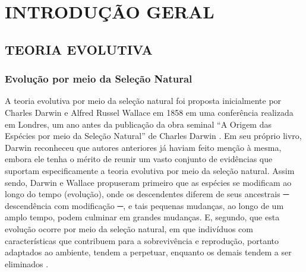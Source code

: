 \chapter{INTRODUÇÃO GERAL}
\label{cap:introducao}

\section{TEORIA EVOLUTIVA}
\label{sec:teoria_evolutiva}

\subsection{Evolução por meio da Seleção Natural}

A teoria evolutiva por meio da seleção natural foi proposta inicialmente por Charles Darwin e Alfred Russel Wallace em 1858 \cite{darwin_tendency_1858} em uma conferência realizada em Londres, um ano antes da publicação da obra seminal “A Origem das Espécies por meio da Seleção Natural” de Charles Darwin \cite{darwin_origin_1859}. Em seu próprio livro, Darwin reconheceu que autores anteriores já haviam feito menção à mesma, embora ele tenha o mérito de reunir um vasto conjunto de evidências que suportam especificamente a teoria evolutiva por meio da seleção natural. Assim sendo, Darwin e Wallace propuseram primeiro que as espécies se modificam ao longo do tempo (evolução), onde os descendentes diferem de seus ancestrais ─ descendência com modificação ─, e tais pequenas mudanças, ao longo de um amplo tempo, podem culminar em grandes mudanças. E, segundo, que esta evolução ocorre por meio da seleção natural, em que indivíduos com características que contribuem para a sobrevivência e reprodução, portanto adaptados ao ambiente, tendem a perpetuar, enquanto os demais tendem a ser eliminados \cite{reece_campbell_2013}. 

